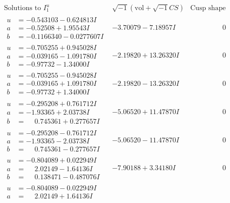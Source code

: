 \documentclass[1p]{elsarticle_modified}
\theoremstyle{definition}
\newcommand{\I}{\sqrt{-1}}
\begin{document}
$$\begin{array}{c|c|c}
\text{Solutions to }I^u_{1}& \I (\text{vol} + \sqrt{-1}CS) & \text{Cusp shape}\\
 \hline 
\begin{aligned}
u &= -0.543103 - 0.624813 I \\
a &= -0.52508 + 1.95543 I \\
b &= -0.1166340 - 0.0277607 I\end{aligned}
 & -3.70079 - 7.18957 I & \phantom{-0.000000 } 0 \\ \hline\begin{aligned}
u &= -0.705255 + 0.945028 I \\
a &= -0.039165 - 1.091780 I \\
b &= -0.97732 - 1.34000 I\end{aligned}
 & -2.19820 + 13.26320 I & \phantom{-0.000000 } 0 \\ \hline\begin{aligned}
u &= -0.705255 - 0.945028 I \\
a &= -0.039165 + 1.091780 I \\
b &= -0.97732 + 1.34000 I\end{aligned}
 & -2.19820 - 13.26320 I & \phantom{-0.000000 } 0 \\ \hline\begin{aligned}
u &= -0.295208 + 0.761712 I \\
a &= -1.93365 + 2.03738 I \\
b &= \phantom{-}0.745361 + 0.277657 I\end{aligned}
 & -5.06520 + 11.47870 I & \phantom{-0.000000 } 0 \\ \hline\begin{aligned}
u &= -0.295208 - 0.761712 I \\
a &= -1.93365 - 2.03738 I \\
b &= \phantom{-}0.745361 - 0.277657 I\end{aligned}
 & -5.06520 - 11.47870 I & \phantom{-0.000000 } 0 \\ \hline\begin{aligned}
u &= -0.804089 + 0.022949 I \\
a &= \phantom{-}2.02149 - 1.64136 I \\
b &= \phantom{-}0.138471 - 0.487076 I\end{aligned}
 & -7.90188 + 3.34180 I & \phantom{-0.000000 } 0 \\ \hline\begin{aligned}
u &= -0.804089 - 0.022949 I \\
a &= \phantom{-}2.02149 + 1.64136 I \\

\end{aligned}
\end{array}$$
\end{document}
